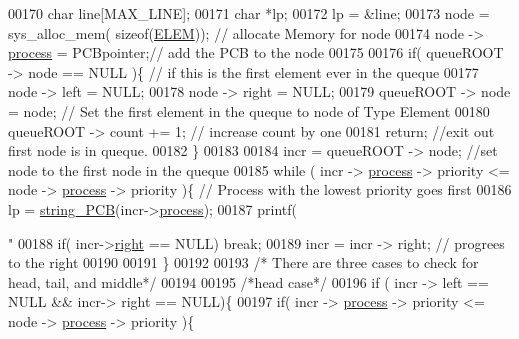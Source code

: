 \begin{DoxyCode}
{00170         \textcolor{keywordtype}{char} line[MAX\_LINE];
00171         \textcolor{keywordtype}{char} *lp;
00172         lp = &line;
00173         node = sys\_alloc\_mem( \textcolor{keyword}{sizeof}(\hyperlink{structpage}{ELEM})); \textcolor{comment}{// allocate Memory for node}
00174         node -> \hyperlink{structprocess}{process} = PCBpointer;\textcolor{comment}{// add the PCB to the node}
00175         
00176         \textcolor{keywordflow}{if}( queueROOT -> node == NULL )\{ \textcolor{comment}{// if this is the first element ever in 
      the queque}
00177                 node -> left = NULL;
00178                 node -> right = NULL;
00179                 queueROOT -> node = node; \textcolor{comment}{// Set the first element in the queque 
      to node of Type Element}
00180                 queueROOT -> count += 1; \textcolor{comment}{// increase count by one}
00181                 \textcolor{keywordflow}{return}; \textcolor{comment}{//exit out first node is in queque. }
00182         \}
00183         
00184         incr = queueROOT -> node; \textcolor{comment}{//set node to the first node in the queque}
00185         \textcolor{keywordflow}{while} ( incr -> \hyperlink{structprocess}{process} -> priority <= node -> \hyperlink{structprocess}{process} -> priority  )\{ \textcolor{comment}{//
       Process with the lowest priority goes first }
00186                     lp = \hyperlink{mpx__r2_8c_aa1ebf78ebfc66e910acd6efdcf6b2437}{string_PCB}(incr->\hyperlink{structpage_af3cc0e1320b79159b230f154f1a95f0d}{process});
00187                         printf(\textcolor{stringliteral}{"%
00188                         \textcolor{keywordflow}{if}( incr->\hyperlink{structpage_a59bb1b5eca2d579befcc93a2833f4dfd}{right} == NULL) \textcolor{keywordflow}{break};
00189                         incr = incr -> right; \textcolor{comment}{// progrees to the right }
00190                         
00191         \}
00192         
00193         \textcolor{comment}{/* There are three cases to check for head, tail, and middle*/}
00194         
00195         \textcolor{comment}{/*head case*/}
00196         \textcolor{keywordflow}{if} ( incr -> left == NULL && incr-> right == NULL)\{
00197                 \textcolor{keywordflow}{if}( incr -> \hyperlink{structprocess}{process} -> priority <= node -> \hyperlink{structprocess}{process} -> priority )\{
      
}}
\end{DoxyCode}
